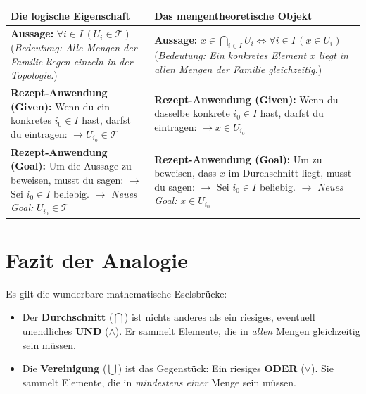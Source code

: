 \documentclass{article}
\begin{document}
\begin{center}
\small
\begin{tabular}{ L{0.45\textwidth} | L{0.45\textwidth} }
\toprule
\textbf{Die logische Eigenschaft} & \textbf{Das mengentheoretische Objekt} \\
\midrule
\textbf{Aussage:} \newline
$\forall i \in I \, (U_i \in \mathcal{T})$ \newline
\newline
(\emph{Bedeutung: Alle Mengen der Familie liegen einzeln in der Topologie.}) &
\textbf{Aussage:} \newline
$x \in \bigcap_{i \in I} U_i \iff \forall i \in I \, (x \in U_i)$ \newline
\newline
(\emph{Bedeutung: Ein konkretes Element $x$ liegt in allen Mengen der Familie gleichzeitig.}) \\
\hline
\textbf{Rezept-Anwendung (Given):} \newline
Wenn du ein konkretes $i_0 \in I$ hast, darfst du eintragen: \newline
$\rightarrow U_{i_0} \in \mathcal{T}$ &
\textbf{Rezept-Anwendung (Given):} \newline
Wenn du dasselbe konkrete $i_0 \in I$ hast, darfst du eintragen: \newline
$\rightarrow x \in U_{i_0}$ \\
\hline
\textbf{Rezept-Anwendung (Goal):} \newline
Um die Aussage zu beweisen, musst du sagen: \newline
$\rightarrow$ Sei $i_0 \in I$ beliebig. \newline
$\rightarrow$ \emph{Neues Goal:} $U_{i_0} \in \mathcal{T}$ &
\textbf{Rezept-Anwendung (Goal):} \newline
Um zu beweisen, dass $x$ im Durchschnitt liegt, musst du sagen: \newline
$\rightarrow$ Sei $i_0 \in I$ beliebig. \newline
$\rightarrow$ \emph{Neues Goal:} $x \in U_{i_0}$ \\
\bottomrule
\end{tabular}
\end{center}

\section*{Fazit der Analogie}

Es gilt die wunderbare mathematische Eselsbrücke:
\begin{itemize}
    \item Der \textbf{Durchschnitt} ($\bigcap$) ist nichts anderes als ein riesiges, eventuell unendliches \textbf{UND} ($\land$). Er sammelt Elemente, die in \emph{allen} Mengen gleichzeitig sein müssen.
    \item Die \textbf{Vereinigung} ($\bigcup$) ist das Gegenstück: Ein riesiges \textbf{ODER} ($\lor$). Sie sammelt Elemente, die in \emph{mindestens einer} Menge sein müssen.
\end{itemize}
\end{document}
